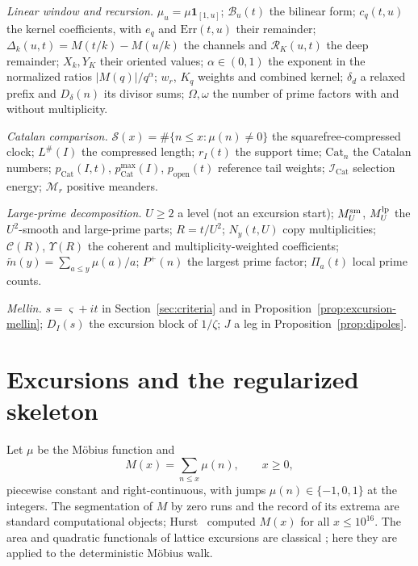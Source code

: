 \documentclass[11pt]{amsart}
\numberwithin{equation}{section}
\theoremstyle{plain}
\theoremstyle{definition}
\theoremstyle{remark}
\newcommand{\Pp}{P^{+}}
\newcommand{\Cc}{\mathcal{C}}
\newcommand{\Sq}{\mathcal{S}}
\newcommand{\mt}{\widetilde{m}}
\begin{document}
\smallskip
\noindent\emph{Linear window and recursion.}
$\mu_u=\mu\mathbf 1_{[1,u]}$; $\mathcal B_u(t)$ the bilinear form;
$c_q(t,u)$ the kernel coefficients, with $e_q$ and $\mathrm{Err}(t,u)$
their remainder; $\Delta_k(u,t)=M(t/k)-M(u/k)$ the channels and
$\mathcal R_K(u,t)$ the deep remainder; $X_k,Y_K$ their oriented values;
$\alpha\in(0,1)$ the exponent in the normalized ratios
$|M(q)|/q^\alpha$; $w_r$, $K_q$ weights and combined kernel;
$\delta_d$ a relaxed prefix and $D_\delta(n)$ its divisor sums;
$\Omega,\omega$ the number of prime factors with and without multiplicity.

\smallskip
\noindent\emph{Catalan comparison.}
$\Sq(x)=\#\{n\le x:\mu(n)\ne0\}$ the squarefree-compressed clock;
$L^\#(I)$ the compressed length; $r_I(t)$ the support time;
$\mathrm{Cat}_n$ the Catalan numbers; $p_{\mathrm{Cat}}(I,t)$,
$p^{\max}_{\mathrm{Cat}}(I)$, $p_{\mathrm{open}}(t)$ reference tail weights;
$\mathcal I_{\mathrm{Cat}}$ selection energy; $\mathcal M_r$ positive meanders.

\smallskip
\noindent\emph{Large-prime decomposition.}
$U\ge2$ a level (not an excursion start); $M^{\rm sm}_U$, $M^{\rm lp}_U$ the
$U^2$-smooth and large-prime parts; $R=t/U^2$; $N_y(t,U)$ copy
multiplicities; $\Cc(R)$, $\Upsilon(R)$ the coherent and multiplicity-weighted
coefficients; $\mt(y)=\sum_{a\le y}\mu(a)/a$; $\Pp(n)$ the largest prime
factor; $\Pi_a(t)$ local prime counts.

\smallskip
\noindent\emph{Mellin.}
$s=\varsigma+it$ in Section~\ref{sec:criteria} and in
Proposition~\ref{prop:excursion-mellin}; $D_I(s)$ the excursion block of
$1/\zeta$; $J$ a leg in Proposition~\ref{prop:dipoles}.

\section{Excursions and the regularized skeleton}
\label{sec:definitions}

Let $\mu$ be the M\"obius function and
\begin{equation}
\label{eq:mertens_def}
M(x)=\sum_{n\le x}\mu(n),\qquad x\ge0,
\end{equation}
piecewise constant and right-continuous, with jumps $\mu(n)\in\{-1,0,1\}$
at the integers. The segmentation of $M$ by zero runs and the record of its
extrema are standard computational objects; Hurst~\cite{Hurst18} computed
$M(x)$ for all $x\le10^{16}$. The area and quadratic functionals of lattice
excursions are classical
\cite{Takacs91,NguyenThe04,Richard05,Janson07,DKW15,CP17}; here they are
applied to the deterministic M\"obius walk.
\end{document}
